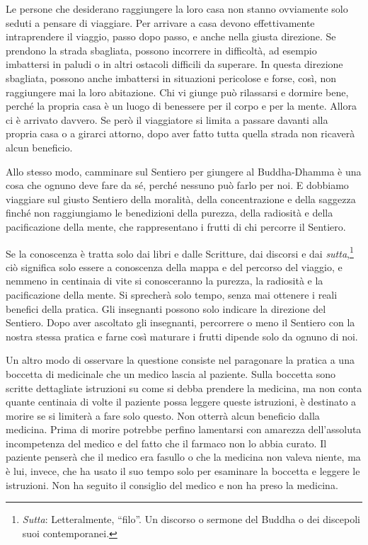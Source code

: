 Le persone che desiderano raggiungere la loro casa non stanno ovviamente
solo seduti a pensare di viaggiare. Per arrivare a casa devono
effettivamente intraprendere il viaggio, passo dopo passo, e anche nella
giusta direzione. Se prendono la strada sbagliata, possono incorrere in
difficoltà, ad esempio imbattersi in paludi o in altri ostacoli
difficili da superare. In questa direzione sbagliata, possono anche
imbattersi in situazioni pericolose e forse, così, non raggiungere mai
la loro abitazione. Chi vi giunge può rilassarsi e dormire bene, perché
la propria casa è un luogo di benessere per il corpo e per la mente.
Allora ci è arrivato davvero. Se però il viaggiatore si limita a passare
davanti alla propria casa o a girarci attorno, dopo aver fatto tutta
quella strada non ricaverà alcun beneficio.

Allo stesso modo, camminare sul Sentiero per giungere al Buddha-Dhamma è
una cosa che ognuno deve fare da sé, perché nessuno può farlo per noi. E
dobbiamo viaggiare sul giusto Sentiero della moralità, della
concentrazione e della saggezza finché non raggiungiamo le benedizioni
della purezza, della radiosità e della pacificazione della mente, che
rappresentano i frutti di chi percorre il Sentiero.

Se la conoscenza è tratta solo dai libri e dalle Scritture, dai discorsi
e dai \emph{sutta},\footnote{\emph{Sutta}: Letteralmente, ``filo''. Un
  discorso o sermone del Buddha o dei discepoli suoi contemporanei.} ciò
significa solo essere a conoscenza della mappa e del percorso del
viaggio, e nemmeno in centinaia di vite si conosceranno la purezza, la
radiosità e la pacificazione della mente. Si sprecherà solo tempo, senza
mai ottenere i reali benefici della pratica. Gli insegnanti possono solo
indicare la direzione del Sentiero. Dopo aver ascoltato gli insegnanti,
percorrere o meno il Sentiero con la nostra stessa pratica e farne così
maturare i frutti dipende solo da ognuno di noi.

Un altro modo di osservare la questione consiste nel paragonare la
pratica a una boccetta di medicinale che un medico lascia al paziente.
Sulla boccetta sono scritte dettagliate istruzioni su come si debba
prendere la medicina, ma non conta quante centinaia di volte il paziente
possa leggere queste istruzioni, è destinato a morire se si limiterà a
fare solo questo. Non otterrà alcun beneficio dalla medicina. Prima di
morire potrebbe perfino lamentarsi con amarezza dell'assoluta
incompetenza del medico e del fatto che il farmaco non lo abbia curato.
Il paziente penserà che il medico era fasullo o che la medicina non
valeva niente, ma è lui, invece, che ha usato il suo tempo solo per
esaminare la boccetta e leggere le istruzioni. Non ha seguito il
consiglio del medico e non ha preso la medicina.

